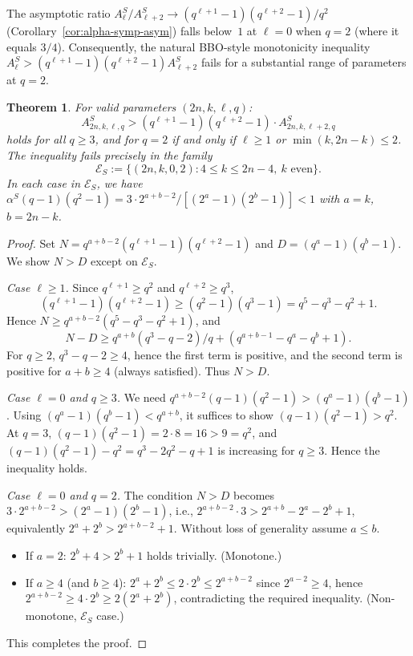 \documentclass[11pt]{article}
\theoremstyle{plain}
\newtheorem{theorem}{Theorem}
\theoremstyle{remark}
\begin{document}
\medskip
The asymptotic ratio
$A^S_\ell / A^S_{\ell+2} \to (q^{\ell+1}-1)(q^{\ell+2}-1)/q^2$
(Corollary~\ref{cor:alpha-symp-asym}) falls below~$1$ at $\ell = 0$ when
$q = 2$ (where it equals $3/4$). Consequently, the natural BBO-style
monotonicity inequality $A^S_{\ell} > (q^{\ell+1}-1)(q^{\ell+2}-1) A^S_{\ell+2}$
fails for a substantial range of parameters at $q = 2$.

\begin{theorem}\label{thm:exception-symp}
For valid parameters $(2n, k, \ell, q)$:
\[
  A^S_{2n,k,\ell,q} > (q^{\ell+1}-1)(q^{\ell+2}-1) \cdot A^S_{2n,k,\ell+2,q}
\]
holds for \emph{all} $q \geq 3$, and for $q = 2$ if and only if $\ell \geq 1$
or $\min(k, 2n-k) \leq 2$.
The inequality fails precisely in the family
\[
  \mathcal{E}_S := \{(2n, k, 0, 2) : 4 \leq k \leq 2n-4,\ k \text{ even}\}.
\]
In each case in $\mathcal{E}_S$, we have $\alpha^S(q-1)(q^2-1) = 3 \cdot 2^{a+b-2}/[(2^a-1)(2^b-1)] < 1$
with $a = k$, $b = 2n - k$.
\end{theorem}

\begin{proof}
Set $N = q^{a+b-2}(q^{\ell+1}-1)(q^{\ell+2}-1)$ and $D = (q^a-1)(q^b-1)$.
We show $N > D$ except on $\mathcal{E}_S$.

\emph{Case $\ell \geq 1$.} Since $q^{\ell+1} \geq q^2$ and $q^{\ell+2} \geq q^3$,
\[
  (q^{\ell+1}-1)(q^{\ell+2}-1) \geq (q^2-1)(q^3-1) = q^5 - q^3 - q^2 + 1.
\]
Hence $N \geq q^{a+b-2}(q^5 - q^3 - q^2 + 1)$, and
\[
  N - D \geq q^{a+b}(q^3 - q - 2)/q + (q^{a+b-1} - q^a - q^b + 1).
\]
For $q \geq 2$, $q^3 - q - 2 \geq 4$, hence the first term is positive,
and the second term is positive for $a + b \geq 4$ (always satisfied).
Thus $N > D$.

\emph{Case $\ell = 0$ and $q \geq 3$.}
We need $q^{a+b-2}(q-1)(q^2-1) > (q^a-1)(q^b-1)$.
Using $(q^a-1)(q^b-1) < q^{a+b}$,
it suffices to show $(q-1)(q^2-1) > q^2$.
At $q = 3$, $(q-1)(q^2-1) = 2 \cdot 8 = 16 > 9 = q^2$,
and $(q-1)(q^2-1) - q^2 = q^3 - 2q^2 - q + 1$ is increasing for $q \geq 3$.
Hence the inequality holds.

\emph{Case $\ell = 0$ and $q = 2$.} The condition $N > D$ becomes
$3 \cdot 2^{a+b-2} > (2^a-1)(2^b-1)$, i.e.,
$2^{a+b-2} \cdot 3 > 2^{a+b} - 2^a - 2^b + 1$, equivalently
$2^a + 2^b > 2^{a+b-2} + 1$.
Without loss of generality assume $a \leq b$.
\begin{itemize}
\item If $a = 2$: $2^b + 4 > 2^b + 1$ holds trivially. (Monotone.)
\item If $a \geq 4$ (and $b \geq 4$): $2^a + 2^b \leq 2 \cdot 2^b \leq 2^{a+b-2}$ since $2^{a-2} \geq 4$, hence
$2^{a+b-2} \geq 4 \cdot 2^b \geq 2(2^a + 2^b)$, contradicting the required inequality.
(Non-monotone, $\mathcal{E}_S$ case.)
\end{itemize}
This completes the proof.
\end{proof}
\end{document}
